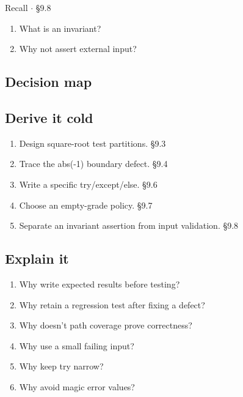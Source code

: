 \documentclass[11pt]{article}
\begin{document}
\begin{keepsection}
\begin{recallbox}{Recall \ensuremath{\cdot} §9.8}
\begin{enumerate}
\item What is an invariant?
\item Why not assert external input?
\end{enumerate}

\end{recallbox}
\end{keepsection}

\begin{keepsection}
\section{Decision map}
\end{keepsection}

\begin{keepsection}
\section{Derive it cold}

\begin{enumerate}
\item Design square-root test partitions. \hfill{\small\color{FAUblue}§9.3}
\item Trace the abs(-1) boundary defect. \hfill{\small\color{FAUblue}§9.4}
\item Write a specific try/except/else. \hfill{\small\color{FAUblue}§9.6}
\item Choose an empty-grade policy. \hfill{\small\color{FAUblue}§9.7}
\item Separate an invariant assertion from input validation. \hfill{\small\color{FAUblue}§9.8}
\end{enumerate}
\end{keepsection}

\begin{keepsection}
\section{Explain it}

\begin{enumerate}
\item Why write expected results before testing?
\item Why retain a regression test after fixing a defect?
\item Why doesn’t path coverage prove correctness?
\item Why use a small failing input?
\item Why keep try narrow?
\item Why avoid magic error values?
\end{enumerate}

\end{keepsection}
\end{document}
